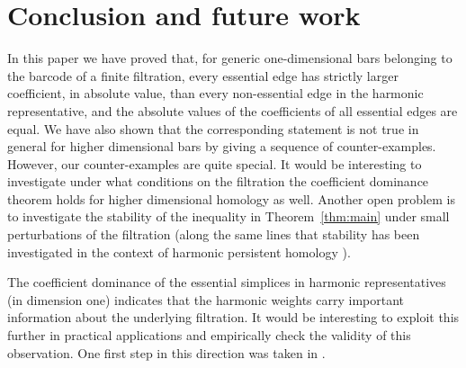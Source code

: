 \documentclass[11pt]{amsart}
\theoremstyle{theorem}
\theoremstyle{remark}
\theoremstyle{definition}
\newcommand{\hide}[1]{}
\begin{document}
\hide{
The bar
\[
b=(1,3;1)
\]
is simple but not generic, because another bar with the same birth time is
present:
\[
(1,2;1).
\]

For this non-generic simple bar, the harmonic representative is
\[
h
=
[01]
+\frac15[02]
-\frac65[04]
+\frac45[13]
+\frac15[14]
-\frac45[23]
+[24],
\]
and the essential edge
\[
\sigma=[01]
\]
has coefficient magnitude \(1\), while the non-essential edge
\[
\tau=[04]
\]
has coefficient magnitude \(6/5\). Thus
\[
|\langle h,\tau\rangle|>|\langle h,\sigma\rangle|.
\]

Therefore the genericity condition that no other bar has the same birth time
cannot be omitted from the coefficient-dominance theorem.
}





\section{Conclusion and future work}
\label{sec:conclusion}
In this paper we have proved that, for generic one-dimensional bars belonging to the barcode of a finite filtration, every essential edge has strictly larger coefficient, in absolute value, than every non-essential edge in the harmonic representative, and the absolute values of the coefficients of all essential edges are equal. We have also shown that the corresponding statement is not true in general for higher dimensional bars by giving a
sequence of counter-examples. However, our counter-examples are quite special. It would be interesting to investigate under what conditions on the filtration the coefficient dominance theorem holds for higher dimensional homology as well. Another open problem is to investigate the stability of the inequality
in Theorem~\ref{thm:main} under small perturbations of the filtration (along the same lines that stability has been investigated in the context of harmonic persistent homology \cite{Basu-Cox,gulen2025grassmannianpersistencediagramsspecial}).

The coefficient dominance of the essential simplices in harmonic representatives (in dimension one) indicates that the harmonic weights carry important information about the underlying filtration. It would be interesting to exploit this further in practical applications and empirically check the validity of this observation. One first step in this direction was taken in \cite{Gurnari-et-al}. 
\end{document}
